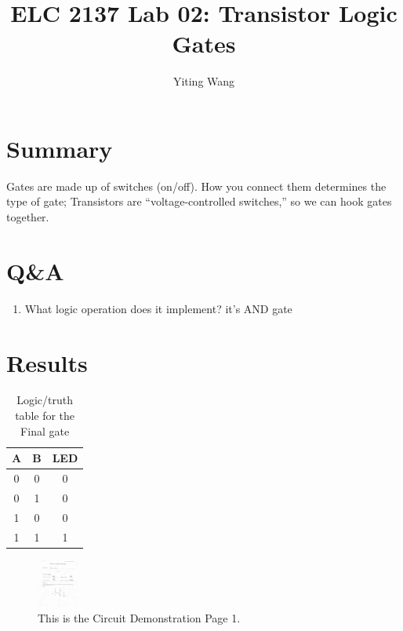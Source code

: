 \documentclass[11pt]{article}
\begin{document}
	
	\title{ELC 2137 Lab 02: Transistor Logic Gates}
	\author{Yiting Wang}
	
	\maketitle
	
	
	\section*{Summary}
	
	Gates are made up of switches (on/off). How you connect them determines the type of gate; 
	Transistors are “voltage-controlled switches,” so we can hook gates together.  
	
	
	\section*{Q\&A}
	
	\begin{enumerate}
		\item What logic operation does it implement?
		it's AND gate
	\end{enumerate}
	
	
	\section*{Results}
	
	\begin{table}[ht]\centering
		\caption{Logic/truth table for the Final gate}
		\label{tbl:example_table}
		\begin{tabular}{cc|c}
			\toprule
			A & B & LED \\
			\midrule
			0 & 0 & 0 \\
			0 & 1 & 0 \\
			1 & 0 & 0 \\
			1 & 1 & 1 \\
			\bottomrule
		\end{tabular}
	\end{table}
	
	\begin{figure}[ht]\centering
		\includegraphics[width=0.12\textwidth]{Lab2Page1}
		\caption{This is the Circuit Demonstration Page 1.}
		\label{fig:original_logo}
	\end{figure}
	
\end{document}
